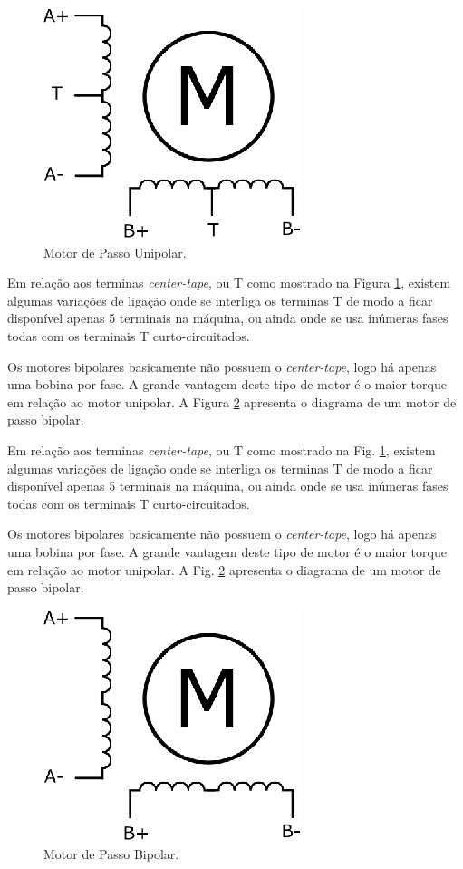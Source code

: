 \begin{figure}[H]
	\centering
	\includegraphics[width = 0.3 \columnwidth]{images/MotorDePassoUnipolar.eps}
	\caption{Motor de Passo Unipolar.}
	\label{fig:MotorDePassoUnipolar}
\end{figure} 

Em relação aos terminas \emph{center-tape}, ou T como mostrado na Figura \ref{fig:MotorDePassoUnipolar}, existem algumas variações de ligação onde se interliga os terminas T de modo a ficar disponível apenas 5 terminais na máquina, ou ainda onde se usa inúmeras fases todas com os terminais T curto-circuitados.   

Os motores bipolares basicamente não possuem o \emph{center-tape}, logo há apenas uma bobina por fase. A grande vantagem deste tipo de motor é o maior torque em relação ao motor unipolar. A Figura \ref{fig:MotorDePassoBipolar} apresenta o diagrama de um motor de passo bipolar.

Em relação aos terminas \emph{center-tape}, ou T como mostrado na Fig. \ref{fig:MotorDePassoUnipolar}, existem algumas variações de ligação onde se interliga os terminas T de modo a ficar disponível apenas 5 terminais na máquina, ou ainda onde se usa inúmeras fases todas com os terminais T curto-circuitados.   

Os motores bipolares basicamente não possuem o \emph{center-tape}, logo há apenas uma bobina por fase. A grande vantagem deste tipo de motor é o maior torque em relação ao motor unipolar. A Fig. \ref{fig:MotorDePassoBipolar} apresenta o diagrama de um motor de passo bipolar.


\begin{figure}[H]
	\centering
	\includegraphics[width = 0.3\columnwidth]{images/MotorDePassoBipolar.eps}
	\caption{Motor de Passo Bipolar.}
	\label{fig:MotorDePassoBipolar}
\end{figure}


